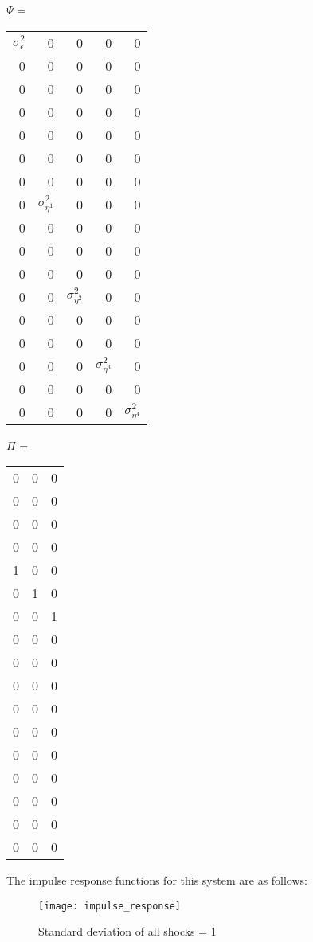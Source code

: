 \documentclass[]{article}
\begin{document}
$ \Psi $ = 
\begin{tabular}{rrrrr}
	$ \sigma^2_{\epsilon} $ & 0 & 0 & 0 & 0 \\
    0                      & 0                      & 0 & 0 & 0 \\
	0                      & 0                      & 0 & 0 & 0 \\
	0                      & 0                      & 0 & 0 & 0 \\	
	0                      & 0                      & 0 & 0 & 0 \\	
	0                      & 0                      & 0 & 0 & 0 \\
	0                      & 0                      & 0 & 0 & 0 \\		
	0                      & $ \sigma^2_{\eta^1} $  & 0 & 0 & 0 \\
	0                      & 0                      & 0 & 0 & 0 \\
	0                      & 0                      & 0 & 0 & 0 \\
	0                      & 0                      & 0 & 0 & 0 \\
	0                      & 0                      & $ \sigma^2_{\eta^2} $ & 0 & 0 \\
	0                      & 0                      & 0 & 0 & 0 \\		
	0                      & 0                      & 0 & 0 & 0 \\
	0                      & 0                      & 0 & $ \sigma^2_{\eta^3} $ & 0 \\
	0                      & 0                      & 0 & 0 & 0 \\
    0                      & 0                      & 0 & 0 & $ \sigma^2_{\eta^4} $ \\		 										
\end{tabular}	

$ \Pi $ = 
\begin{tabular}{rrr}
	0 & 0 & 0 \\
	0 & 0 & 0 \\	
	0 & 0 & 0 \\	
	0 & 0 & 0 \\	
	1 & 0 & 0 \\	
	0 & 1 & 0 \\	
	0 & 0 & 1 \\
	0 & 0 & 0 \\
	0 & 0 & 0 \\
	0 & 0 & 0 \\
	0 & 0 & 0 \\
	0 & 0 & 0 \\
	0 & 0 & 0 \\
	0 & 0 & 0 \\
	0 & 0 & 0 \\
	0 & 0 & 0 \\
	0 & 0 & 0 \\
\end{tabular}
The impulse response functions for this system are as follows:
\begin{figure}[H]
	\centering
	\texttt{[image: impulse\_response]}
	\caption{Standard deviation of all shocks = 1}
\end{figure}
\end{document}
